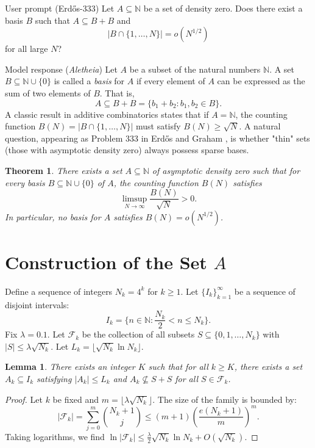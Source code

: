 \documentclass[11pt]{article}
\newcommand{\N}{\mathbb{N}}
\newcommand{\Nzero}{\mathbb{N} \cup \{0\}}
\newtheorem{theorem}{Theorem}
\newtheorem{lemma}{Lemma}
\begin{document}
\begin{problem}{User prompt (Erd\H{o}s-333)}
Let $A\subseteq \mathbb{N}$ be a set of density zero. Does there exist a basis $B$ such that $A\subseteq B+B$ and\[\lvert B\cap \{1,\ldots,N\}\rvert =o(N^{1/2})\]for all large $N$?
\end{problem}

\begin{solution}{Model response (\textit{Aletheia})}
Let $A$ be a subset of the natural numbers $\N$. A set $B \subseteq \Nzero$ is called a \textit{basis} for $A$ if every element of $A$ can be expressed as the sum of two elements of $B$. That is,
\[
A \subseteq B+B = \{ b_1 + b_2 : b_1, b_2 \in B \}.
\]
A classic result in additive combinatorics states that if $A = \N$, the counting function $B(N) = |B \cap \{1, \ldots, N\}|$ must satisfy $B(N) \ge \sqrt{N}$. A natural question, appearing as Problem 333 in Erdős and Graham \cite{ErdosGraham}, is whether "thin" sets (those with asymptotic density zero) always possess sparse bases.

\begin{theorem} \label{thm:main}
There exists a set $A \subseteq \N$ of asymptotic density zero such that for every basis $B \subseteq \Nzero$ of $A$, the counting function $B(N)$ satisfies
\[
\limsup_{N \to \infty} \frac{B(N)}{\sqrt{N}} > 0.
\]
In particular, no basis for $A$ satisfies $B(N) = o(N^{1/2})$.
\end{theorem}

\section{Construction of the Set $A$}

Define a sequence of integers $N_k = 4^k$ for $k \ge 1$. Let $\{I_k\}_{k=1}^\infty$ be a sequence of disjoint intervals:
\[
I_k = \{ n \in \N : \frac{N_k}{2} < n \le N_k \}.
\]
Fix $\lambda = 0.1$. Let $\mathcal{F}_k$ be the collection of all subsets $S \subseteq \{0, 1, \ldots, N_k\}$ with $|S| \le \lambda \sqrt{N_k}$. Let $L_k = \lfloor \sqrt{N_k} \ln N_k \rfloor$.

\begin{lemma} \label{lemma:prob_existence}
There exists an integer $K$ such that for all $k \ge K$, there exists a set $A_k \subseteq I_k$ satisfying $|A_k| \le L_k$ and $A_k \not\subseteq S+S$ for all $S \in \mathcal{F}_k$.
\end{lemma}

\begin{proof}
Let $k$ be fixed and $m = \lfloor \lambda \sqrt{N_k} \rfloor$. The size of the family is bounded by:
\[
|\mathcal{F}_k| = \sum_{j=0}^m \binom{N_k+1}{j} \le (m+1) \left( \frac{e(N_k+1)}{m} \right)^m.
\]
Taking logarithms, we find $\ln |\mathcal{F}_k| \le \frac{\lambda}{2} \sqrt{N_k} \ln N_k + O(\sqrt{N_k})$.


\end{proof}
\end{solution}
\end{document}
